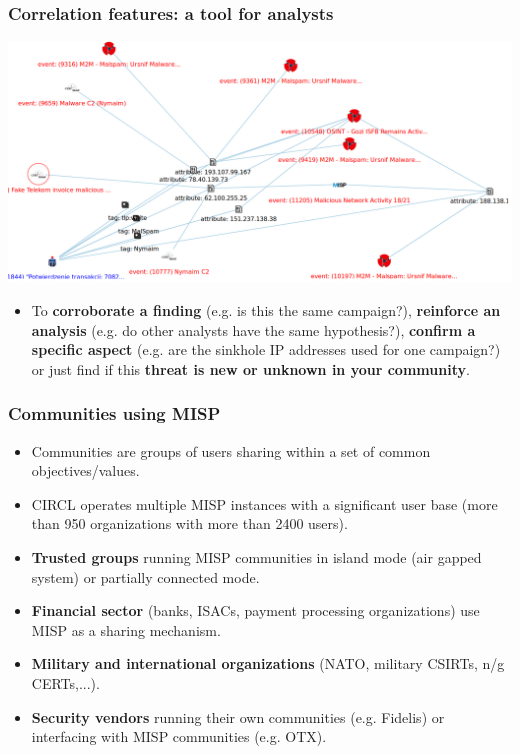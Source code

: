 \begin{frame}
        \frametitle{Correlation features: a tool for analysts}
        \includegraphics[scale=0.18]{screenshots/campaign.png}
        \begin{itemize}
                \item To {\bf corroborate a finding} (e.g. is this the same campaign?), {\bf reinforce an analysis} (e.g. do other analysts have the same hypothesis?), {\bf confirm a specific aspect} (e.g. are the sinkhole IP addresses used for one campaign?) or just find if this {\bf threat is new or unknown in your community}.
        \end{itemize}
\end{frame}


\begin{frame}
 \frametitle{Communities using MISP}
 \begin{itemize}
	 \item Communities are groups of users sharing within a set of common objectives/values.
	 \item CIRCL operates multiple MISP instances with a significant user base (more than 950 organizations with more than 2400 users).
     \item {\bf Trusted groups} running MISP communities in island mode (air gapped system) or partially connected mode.
	 \item {\bf Financial sector} (banks, ISACs, payment processing organizations) use MISP as a sharing mechanism.
	 \item {\bf Military and international organizations} (NATO, military CSIRTs, n/g CERTs,...).
	 \item {\bf Security vendors} running their own communities (e.g. Fidelis) or interfacing with MISP communities (e.g. OTX).
 \end{itemize}
\end{frame}


